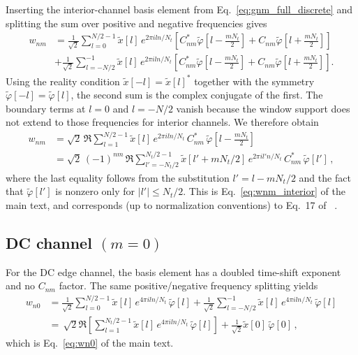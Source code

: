 \documentclass[twocolumn,preprintnumbers,
  superscriptaddress,
  nofootinbib,
  amsmath,
  amssymb,
  aps,
  prd,
  colorlinks=true,
  linkcolor=blue,
  urlcolor=blue,
  citecolor=blue,
  anchorcolor=blue
]{revtex4-2}
\begin{document}
Inserting the interior-channel basis element from
Eq.~\eqref{eq:gnm_full_discrete} and splitting the sum over positive and
negative frequencies gives
\begin{align}
w_{nm}&=\frac{1}{\sqrt{2}}\sum_{l=0}^{N/2-1} \tilde{x}[l]\, e^{2\pi iln/N_t}\left[C_{nm}^*\tilde{\varphi}\!\left[l-\tfrac{mN_t}{2}\right]+C_{nm}\tilde{\varphi}\!\left[l+\tfrac{mN_t}{2}\right]\right]\nonumber\\
&+\frac{1}{\sqrt{2}}\sum_{l=-N/2}^{-1} \tilde{x}[l]\, e^{2\pi iln/N_t}\left[C_{nm}^*\tilde{\varphi}\!\left[l\!-\!\tfrac{mN_t}{2}\right]+C_{nm}\tilde{\varphi}\!\left[l\!+\!\tfrac{mN_t}{2}\right]\right].
\end{align}
Using the reality
condition $\tilde{x}[-l] = \tilde{x}[l]^*$ together with the
symmetry $\tilde{\varphi}[-l] = \tilde{\varphi}[l]$, the second sum
is the complex conjugate of the first. The boundary terms at $l=0$
and $l=-N/2$ vanish because the window support does not extend to
those frequencies for interior channels. We therefore obtain
\begin{align}\label{eq:app_wnm_general}
  w_{nm}&=\sqrt{2}\,\Re\sum_{l=1}^{N/2-1} \tilde{x}[l]\, e^{2\pi
  iln/N_t}\,C_{nm}^*\,\tilde{\varphi}\!\left[l-\tfrac{mN_t}{2}\right]\nonumber\\
  &=\sqrt{2}\,(-1)^{nm}\,\Re\sum_{l'=-N_t/2}^{N_t/2-1}
  \tilde{x}[l'+mN_t/2]\, e^{2\pi
  il'n/N_t}\,C_{nm}^*\,\tilde{\varphi}[l']\,,
\end{align}
where the last equality follows from the substitution $l' = l -
mN_t/2$ and the fact that $\tilde{\varphi}[l']$ is nonzero only
for $|l'| \leq N_t/2$. This is Eq.~\eqref{eq:wnm_interior} of the
main text, and corresponds (up to normalization conventions) to
Eq.~17 of ~\cite{Cornish:2020odn}.

\subsection{DC channel \texorpdfstring{$(m = 0)$}{(m=0)}}

For the DC edge channel, the basis element has a doubled time-shift
exponent and no $C_{nm}$ factor. The same positive/negative frequency
splitting yields
\begin{align}
  w_{n0}&=\frac{1}{\sqrt{2}}\sum_{l=0}^{N/2-1} \tilde{x}[l]\, e^{4\pi
  iln/N_t}\,\tilde{\varphi}[l]
  +\frac{1}{\sqrt{2}}\sum_{l=-N/2}^{-1} \tilde{x}[l]\, e^{4\pi
  iln/N_t}\,\tilde{\varphi}[l]
  \nonumber\\
  &=\,\sqrt{2}\Re\left[\sum_{l=1}^{N_t/2-1} \tilde{x}[l]\, e^{4\pi
  iln/N_t}\,\tilde{\varphi}[l]\right]+\frac{1}{\sqrt{2}}\tilde{x}[0]\,\tilde{\varphi}[0]\,,
\end{align}
which is Eq.~\eqref{eq:wn0} of the main text.
\end{document}
